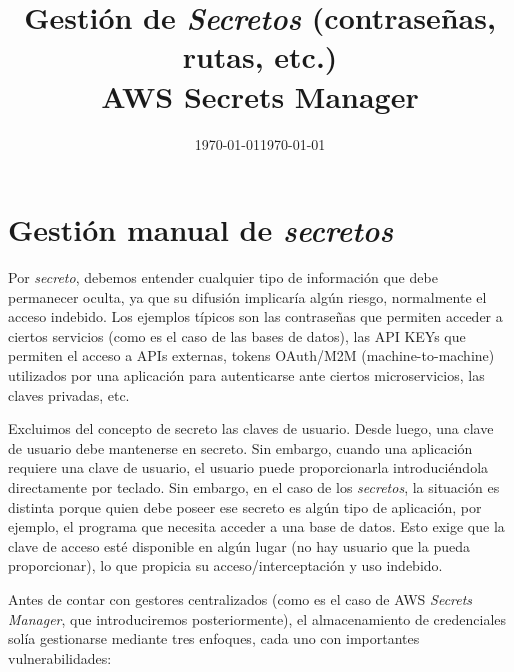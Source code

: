\documentclass[11pt,a4paper]{article}
\title{Gestión de \textit{Secretos} (contraseñas, rutas, etc.)\\AWS Secrets Manager}
\author{}
\date{\today}
\begin{document}

\date{\normalsize\today} %

\maketitle


{
\let\clearpage\relax
\tableofcontents
}

\section{Gestión manual de \textit{secretos}}

Por \textit{secreto}, debemos entender cualquier tipo de información que debe permanecer oculta, ya que su difusión implicaría algún riesgo, normalmente el acceso indebido. Los ejemplos típicos son las contraseñas que permiten acceder a ciertos servicios (como es el caso de las bases de datos), las API KEYs que permiten el acceso a APIs externas, tokens OAuth/M2M (machine-to-machine) utilizados por una aplicación para autenticarse ante ciertos microservicios, las claves privadas, etc.

Excluimos del concepto de secreto las claves de usuario. Desde luego, una clave de usuario debe mantenerse en secreto. Sin embargo, cuando una aplicación requiere una clave de usuario, el usuario puede proporcionarla introduciéndola directamente por teclado. Sin embargo, en el caso de los \textit{secretos}, la situación es distinta porque quien debe poseer ese secreto es algún tipo de aplicación, por ejemplo, el programa que necesita acceder a una base de datos. Esto exige que la clave de acceso esté disponible en algún lugar (no hay usuario que la pueda proporcionar), lo que propicia su acceso/interceptación y uso indebido.

Antes de contar con gestores centralizados (como es el caso de AWS \textit{Secrets Manager}, que introduciremos posteriormente), el almacenamiento de credenciales solía gestionarse mediante tres enfoques, cada uno con importantes vulnerabilidades:
\end{document}
